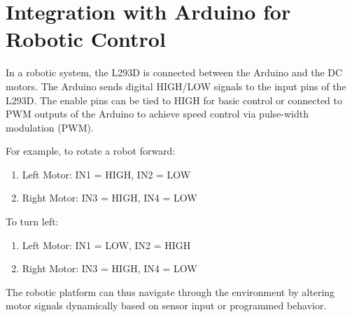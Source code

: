 \documentclass[a4paper,12pt]{article}
\begin{document}
	\section*{Integration with Arduino for Robotic Control}
	
	In a robotic system, the L293D is connected between the Arduino and the DC motors. The Arduino sends digital HIGH/LOW signals to the input pins of the L293D. The enable pins can be tied to HIGH for basic control or connected to PWM outputs of the Arduino to achieve speed control via pulse-width modulation (PWM).
	
	\noindent For example, to rotate a robot forward:
	\begin{enumerate}
		\item Left Motor: IN1 = HIGH, IN2 = LOW
		\item Right Motor: IN3 = HIGH, IN4 = LOW
	\end{enumerate}
	
	\noindent To turn left:
	\begin{enumerate}
		\item Left Motor: IN1 = LOW, IN2 = HIGH
		\item Right Motor: IN3 = HIGH, IN4 = LOW
	\end{enumerate}
	
	\noindent The robotic platform can thus navigate through the environment by altering motor signals dynamically based on sensor input or programmed behavior.
	
\end{document}
